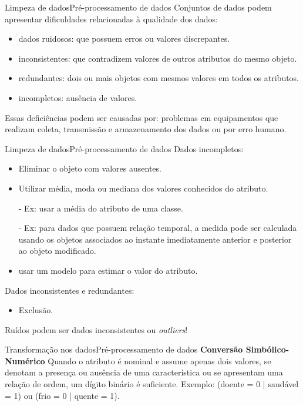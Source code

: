 \documentclass[t]{beamer}
\begin{document}
\begin{ftst}{Limpeza de dados}{Pré-processamento de dados}
\justifying
Conjuntos de dados podem apresentar dificuldades relacionadas à qualidade dos dados:
\begin{itemize}
    \item dados ruidosos: que possuem erros ou valores discrepantes.
    \item inconsistentes: que contradizem valores de outros atributos do mesmo objeto.
    \item redundantes: dois ou mais objetos com mesmos valores em todos os atributos.
    \item incompletos: ausência de valores.
\end{itemize}
\vone
Essas deficiências podem ser causadas por: problemas em equipamentos que realizam coleta, transmissão e armazenamento dos dados ou por erro humano.

\end{ftst}


\begin{ftst}{Limpeza de dados}{Pré-processamento de dados}
\justifying
Dados incompletos:
\small
\begin{itemize}
    \item Eliminar o objeto com valores ausentes.
    \item Utilizar média, moda ou mediana dos valores conhecidos do atributo.
    
    - Ex: usar a média do atributo de uma classe.
    
    - Ex: para dados que possuem relação temporal, a medida pode ser calculada usando os objetos associados ao instante imediatamente anterior e posterior ao objeto modificado.
    \item usar um modelo para estimar o valor do atributo.
\end{itemize}
\vone
\normalsize
Dados inconsistentes e redundantes:
\begin{itemize}
    \item Exclusão.
\end{itemize}
\vone
Ruídos podem ser dados inconsistentes ou \textit{outliers}!
\end{ftst}


\begin{ftst}{Transformação nos dados}{Pré-processamento de dados}
\justifying
\textbf{Conversão Simbólico-Numérico}
\vone
Quando o atributo é nominal e assume apenas dois valores, se denotam a presença ou ausência de uma característica ou se apresentam uma relação de ordem, um dígito binário é suficiente.
\vone
Exemplo: (doente = 0 | saudável = 1) ou (frio = 0 | quente = 1).




\end{ftst}
\end{document}
